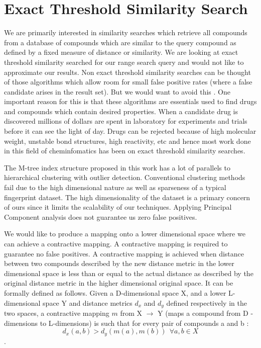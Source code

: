 \section{Exact Threshold Similarity Search}

We are primarily interested in similarity searches which retrieve all compounds from a database of compounds which are similar to the query compound as defined by a fixed measure of distance or similarity. We are looking at exact threshold similarity searched for our range search query and would not like to approximate our results. Non exact threshold similarity searches can be thought of those algorithms which allow room for small false positive rates (where a false candidate arises in the result set). But we would want to avoid this . One important reason for this is that these algorithms are essentials used to find drugs and compounds which contain desired properties. When a candidate drug is discovered millions of dollars are spent in laboratory for experiments and trials before it can see the light of day. Drugs can be rejected because of high molecular weight, unstable bond structures, high reactivity, etc and hence most work done in this field of cheminfomatics has been on exact threshold similarity searches. 

The M-tree index structure proposed in this work has a lot of parallels to hierarchical clustering with outlier detection. Conventional clustering methods fail due to the high dimensional nature as well as sparseness of a typical fingerprint dataset. The high dimensionality of the dataset is a primary concern of ours since it limits the scalability of our techniques. Applying Principal Component analysis does not guarantee us zero false positives. 

We would like to produce a mapping onto a lower dimensional space where we can achieve a contractive mapping. A contractive mapping is required to guarantee no false positives. A contractive mapping is achieved when distance between two compounds described by the new distance metric in the lower dimensional space is less than or equal to the actual distance as described by the original distance metric in the higher dimensional original space. It can be formally defined as follows. Given a D-dimensional space X, and a lower L-dimensional space Y and distance metrics $d_x$ and $d_y$ defined respectively in the two spaces, a contractive mapping $m$ from X $\rightarrow$ Y (maps a compound from D -dimensions to L-dimensions) is such that for every pair of compounds a and b : 
\[ d_x(a,b) > d_y(m(a),m(b))~~ \forall a,b \in X \].

